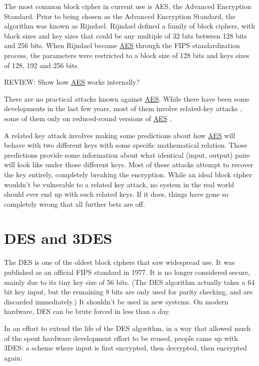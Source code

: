 \documentclass[11pt,ebook,table,dvipsnames]{memoir}
\begin{document}
The most common block cipher in current use is \gls{AES}, the Advanced
Encryption Standard. Prior to being chosen as the Advanced Encryption
Standard, the algorithm was known as Rijndael. Rijndael defined a
family of block ciphers, with block sizes and key sizes that could be
any multiple of 32 bits between 128 bits and 256 bits.
\cite{daemen:aes} When Rijndael became \hyperref[AES]{AES} through the \gls{FIPS}
standardization process, the parameters were restricted to a block
size of 128 bits and keys sizes of 128, 192 and 256 bits.
\cite{fips:aes}

REVIEW: Show how \hyperref[AES]{AES} works internally?

There are no practical attacks known against \hyperref[AES]{AES}. While there have
been some developments in the last few years, most of them involve
related-key attacks \cite{cryptoeprint:2009:317}, some of them only on
reduced-round versions of \hyperref[AES]{AES} \cite{cryptoeprint:2009:374}.

A related key attack involves making some predictions about how \hyperref[AES]{AES}
will behave with two different keys with some specific mathematical
relation. Those predictions provide some information about what
identical (input, output) pairs will look like under those different
keys. Most of these attacks attempt to recover the key entirely,
completely breaking the encryption. While an ideal block cipher
wouldn't be vulnerable to a related key attack, no system in the real
world should ever end up with such related keys. If it does, things
have gone so completely wrong that all further bets are off.
\section{DES and 3DES}
\label{sec-2-2-3}

The \gls{DES} is one of the oldest block ciphers that saw widespread
use. It was published as an official \gls{FIPS} standard in 1977. It
is no longer considered secure, mainly due to its tiny key size of 56
bits. (The DES algorithm actually takes a 64 bit key input, but the
remaining 8 bits are only used for parity checking, and are discarded
immediately.) It shouldn't be used in new systems. On modern hardware,
DES can be brute forced in less
 than a day. \cite{sciengines:breakdes}

In an effort to extend the life of the DES algorithm, in a way that
allowed much of the spent hardware development effort to be reused,
people came up with 3DES: a scheme where input is first encrypted,
then decrypted, then encrypted again:
\end{document}

